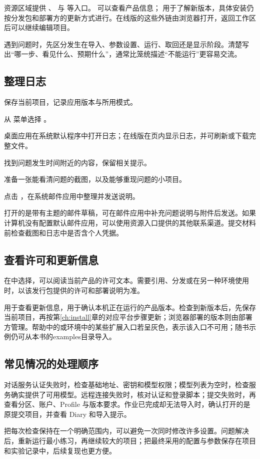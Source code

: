 资源区域提供 、 与  等入口。 可以查看产品信息； 用于了解新版本，具体安装仍按分发包和部署方的更新方式进行。在线版的这些外链由浏览器打开，返回工作区后可以继续编辑项目。

遇到问题时，先区分发生在导入、参数设置、运行、取回还是显示阶段。清楚写出“哪一步、看见什么、预期什么”，通常比笼统描述“不能运行”更容易交流。

\subsection{整理日志}

\begin{steps}
\item 保存当前项目，记录应用版本与所用模式。
\item 从  菜单选择 。
\item 桌面应用在系统默认程序中打开日志；在线版在页内显示日志，并可刷新或下载完整文件。
\item 找到问题发生时间附近的内容，保留相关提示。
\item 准备一张能看清问题的截图，以及能够重现问题的小项目。
\item 点击 ，在系统邮件应用中整理并发送说明。
\end{steps}

 打开的是带有主题的邮件草稿，可在邮件应用中补充问题说明与附件后发送。如果计算机没有配置默认邮件应用，可以使用资源入口提供的其他联系渠道。提交材料前检查截图和日志中是否含个人凭据。


\subsection{查看许可和更新信息}

在中选择，可以阅读当前产品的许可文本。需要引用、分发或在另一种环境使用时，以该发行包提供的许可和部署说明为准。

用于查看更新信息，用于确认本机正在运行的产品版本。检查到新版本后，先保存当前项目，再按第\ref{ch:install}章的对应平台步骤更新；浏览器部署的版本则由部署方管理。帮助中的或环境中的某些扩展入口若呈灰色，表示该入口不可用；随书示例仍可从本书的examples目录导入。


\subsection{常见情况的处理顺序}

对话服务认证失败时，检查基础地址、密钥和模型权限；模型列表为空时，检查服务确实提供了可用模型。远程连接失败时，核对认证和登录脚本；提交失败时，再查看分区、账户、Profile 与版本要求。作业已完成却无法导入时，确认打开的是原提交项目，并查看 Diary 和导入提示。

把每次检查保持在一个明确范围内，可以避免一次同时修改许多设置。问题解决后，重新运行最小练习，再继续较大的项目；把最终采用的配置与参数保存在项目和实验记录中，后续复现也更方便。
